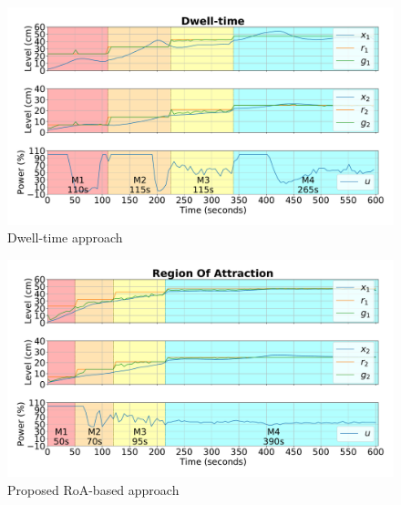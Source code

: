 \begin{figure}[ht!]
	\centering \captionsetup{justification=centering}
	\includegraphics[width=\linewidth]{imgs/tanks-dwell}
	\caption{Dwell-time approach}%
	\label{fig:tanks-dwell}
\end{figure}

\begin{figure}[ht!]
	\centering \captionsetup{justification=centering}
	\includegraphics[width=\linewidth]{imgs/tanks-roa}
	\caption{Proposed RoA-based approach}%
	\label{fig:tanks-roa}
\end{figure}
